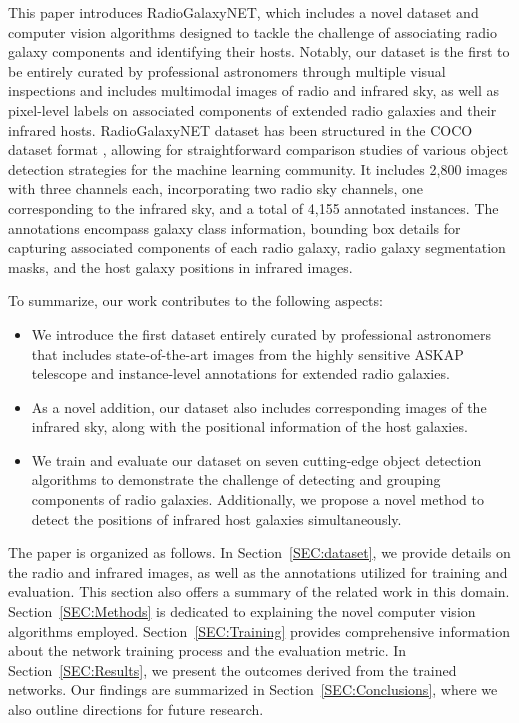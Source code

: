 \documentclass[
  journal=pasa,
  manuscript=research-paper, %
  year=2020,
  volume=37,
]{cup-journal}
\begin{document}
This paper introduces RadioGalaxyNET, which includes a novel dataset and computer vision algorithms designed to tackle the challenge of associating radio galaxy components and identifying their hosts. 
Notably, our dataset is the first to be entirely curated by professional astronomers through multiple visual inspections and includes multimodal images of radio and infrared sky, as well as pixel-level labels on associated components of extended radio galaxies and their infrared hosts.
RadioGalaxyNET dataset has been structured in the COCO dataset format \citep{lin14M}, allowing for straightforward comparison studies of various object detection strategies for the machine learning community.
It includes 2,800 images with three channels each, incorporating two radio sky channels, one corresponding to the infrared sky, and a total of 4,155 annotated instances. The annotations encompass galaxy class information, bounding box details for capturing associated components of each radio galaxy, radio galaxy segmentation masks, and the host galaxy positions in infrared images.

To summarize, our work contributes to the following aspects:
\begin{itemize}
\setlength\itemsep{0.5em}
\item We introduce the first dataset entirely curated by professional astronomers that includes state-of-the-art images from the highly sensitive ASKAP telescope and instance-level annotations for extended radio galaxies.
\item As a novel addition, our dataset also includes corresponding images of the infrared sky, along with the positional information of the host galaxies.
\item We train and evaluate our dataset on seven cutting-edge object detection algorithms to demonstrate the challenge of detecting and grouping components of radio galaxies. Additionally, we propose a novel method to detect the positions of infrared host galaxies simultaneously.
\end{itemize}

The paper is organized as follows. In Section~\ref{SEC:dataset}, we provide details on the radio and infrared images, as well as the annotations utilized for training and evaluation. This section also offers a summary of the related work in this domain. Section~\ref{SEC:Methods} is dedicated to explaining the novel computer vision algorithms employed. Section~\ref{SEC:Training} provides comprehensive information about the network training process and the evaluation metric. In Section~\ref{SEC:Results}, we present the outcomes derived from the trained networks. Our findings are summarized in Section~\ref{SEC:Conclusions}, where we also outline directions for future research.
\end{document}
